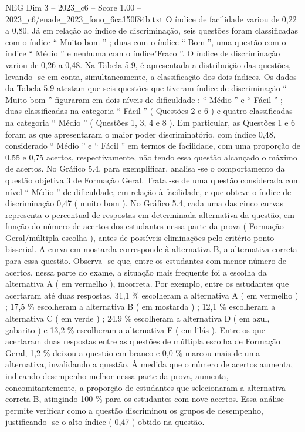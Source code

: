 \begin{textsample}{NEG Dim 3 – 2023\_c6 – Score 1.00 – 2023\_c6/enade\_2023\_fono\_6ca150f84b.txt}
O índice de facilidade variou de 0,22 a 0,80.
Já em relação ao índice de discriminação, seis questões foram classificadas com o índice “ Muito bom ” ; duas com o índice “ Bom ”, uma questão com o índice “ Médio ” e nenhuma com o índice"Fraco ”.
O índice de discriminação variou de 0,26 a 0,48.
Na Tabela 5.9, é apresentada a distribuição das questões, levando -se em conta, simultaneamente, a classificação dos dois índices.
Os dados da Tabela 5.9 atestam que seis questões que tiveram índice de discriminação “ Muito bom ” figuraram em dois níveis de dificuldade : “ Médio ” e “ Fácil ” ; duas classificadas na categoria “ Fácil ” ( Questões 2 e 6 ) e quatro classificadas na categoria “ Médio ” ( Questões 1, 3, 4 e 8 ).
Em particular, as Questões 1 e 6 foram as que apresentaram o maior poder discriminatório, com índice 0,48, considerado “ Médio ” e “ Fácil ” em termos de facilidade, com uma proporção de 0,55 e 0,75 acertos, respectivamente, não tendo essa questão alcançado o máximo de acertos.
No Gráfico 5.4, para exemplificar, analisa -se o comportamento da questão objetiva 3 de Formação Geral.
Trata -se de uma questão considerada com nível “ Médio ” de dificuldade, em relação à facilidade, e que obteve o índice de discriminação 0,47 ( muito bom ).
No Gráfico 5.4, cada uma das cinco curvas representa o percentual de respostas em determinada alternativa da questão, em função do número de acertos dos estudantes nessa parte da prova ( Formação Geral/múltipla escolha ), antes de possíveis eliminações pelo critério ponto-bisserial.
A curva em mostarda corresponde à alternativa B, a alternativa correta para essa questão.
Observa -se que, entre os estudantes com menor número de acertos, nessa parte do exame, a situação mais frequente foi a escolha da alternativa A ( em vermelho ), incorreta.
Por exemplo, entre os estudantes que acertaram até duas respostas, 31,1 \% escolheram a alternativa A ( em vermelho ) ; 17,5 \% escolheram a alternativa B ( em mostarda ) ; 12,1 \% escolheram a alternativa C ( em verde ) ; 24,9 \% escolheram a alternativa D ( em azul, gabarito ) e 13,2 \% escolheram a alternativa E ( em lilás ).
Entre os que acertaram duas respostas entre as questões de múltipla escolha de Formação Geral, 1,2 \% deixou a questão em branco e 0,0 \% marcou mais de uma alternativa, invalidando a questão.
À medida que o número de acertos aumenta, indicando desempenho melhor nessa parte da prova, aumenta, concomitantemente, a proporção de estudantes que selecionaram a alternativa correta B, atingindo 100 \% para os estudantes com nove acertos.
Essa análise permite verificar como a questão discriminou os grupos de desempenho, justificando -se o alto índice ( 0,47 ) obtido na questão.

\end{textsample}
